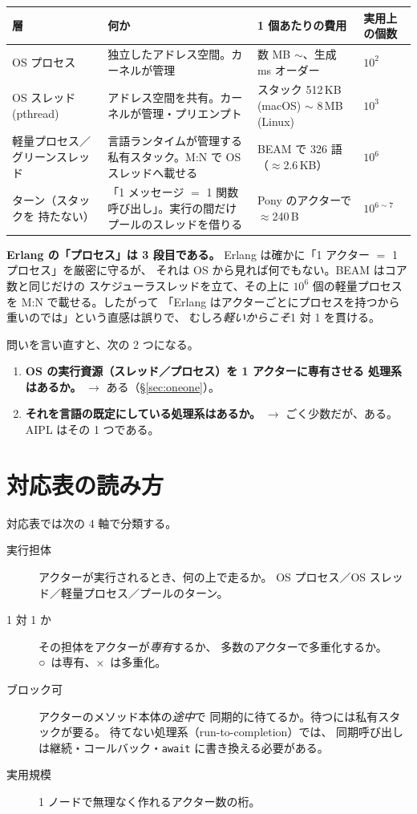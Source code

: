 \documentclass[11pt,a4paper]{ltjsarticle}
\newcommand{\yes}{\textbf{○}}
\newcommand{\no}{×}
\begin{document}
\begin{center}
\small
\begin{tabular}{@{}p{3.4cm}p{5.0cm}p{4.4cm}l@{}}
\toprule
層 & 何か & 1 個あたりの費用 & 実用上の個数 \\
\midrule
OS プロセス
  & 独立したアドレス空間。カーネルが管理
  & 数 MB $\sim$、生成 ms オーダー & $10^{2}$ \\
OS スレッド (pthread)
  & アドレス空間を共有。カーネルが管理・プリエンプト
  & スタック 512\,KB (macOS) $\sim$ 8\,MB (Linux) & $10^{3}$ \\
軽量プロセス／ グリーンスレッド
  & 言語ランタイムが管理する私有スタック。M:N で OS スレッドへ載せる
  & BEAM で 326 語（$\approx$2.6\,KB）& $10^{6}$ \\
ターン（スタックを 持たない）
  & 「1 メッセージ $=$ 1 関数呼び出し」。実行の間だけプールのスレッドを借りる
  & Pony のアクターで $\approx$240\,B & $10^{6\sim7}$ \\
\bottomrule
\end{tabular}
\end{center}

\textbf{Erlang の「プロセス」は 3 段目である。}
Erlang は確かに「1 アクター $=$ 1 プロセス」を厳密に守るが、
それは OS から見れば何でもない。BEAM はコア数と同じだけの
スケジューラスレッドを立て、その上に $10^{6}$ 個の軽量プロセスを
M:N で載せる。したがって
「Erlang はアクターごとにプロセスを持つから重いのでは」という直感は誤りで、
むしろ\emph{軽いからこそ}1 対 1 を貫ける。

問いを言い直すと、次の 2 つになる。

\begin{enumerate}
\item \textbf{OS の実行資源（スレッド／プロセス）を 1 アクターに専有させる
  処理系はあるか。} $\rightarrow$ ある（\S\ref{sec:oneone}）。
\item \textbf{それを言語の既定にしている処理系はあるか。} $\rightarrow$
  ごく少数だが、ある。AIPL はその 1 つである。
\end{enumerate}

\section{対応表の読み方}

対応表では次の 4 軸で分類する。

\begin{description}
\item[実行担体] アクターが実行されるとき、何の上で走るか。
  OS プロセス／OS スレッド／軽量プロセス／プールのターン。
\item[1 対 1 か] その担体をアクターが\emph{専有}するか、
  多数のアクターで多重化するか。\yes\ は専有、\no\ は多重化。
\item[ブロック可] アクターのメソッド本体の\emph{途中}で
  同期的に待てるか。待つには私有スタックが要る。
  待てない処理系（run-to-completion）では、
  同期呼び出しは継続・コールバック・\texttt{await} に書き換える必要がある。
\item[実用規模] 1 ノードで無理なく作れるアクター数の桁。
\end{description}
\end{document}
